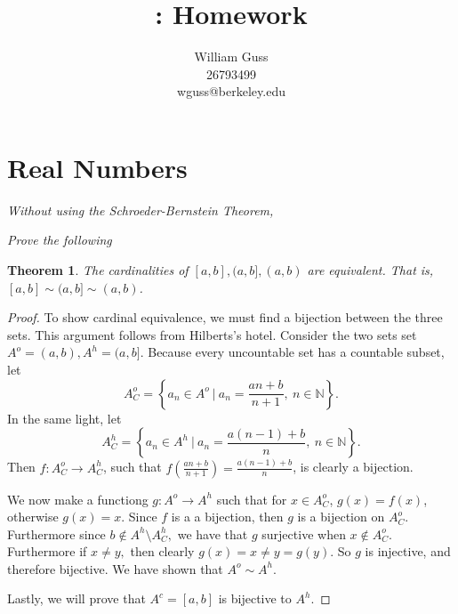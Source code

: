 \documentclass[letter]{article}
\title{\bCLASS: Homework \bHWN}
\author{William Guss\\26793499\\wguss@berkeley.edu}
\newtheorem{theorem}{Theorem}
\newenvironment{menumerate}{%
  \edef\backupindent{\the\parindent}%
  \enumerate%
  \setlength{\parindent}{\backupindent}%
}{\endenumerate}
\begin{document}
\maketitle
\thispagestyle{empty}


\section{Real Numbers}
\begin{menumerate}
	\setcounter{enumi}{35}
	\item \textit{Without using the Schroeder-Bernstein Theorem,}
		\begin{menumerate}
		 	\item \textit{Prove the following}
		 		\begin{theorem}
		 			The cardinalities of $[a,b], (a,b], (a,b)$ are equivalent.
		 			 That is, $[a,b]\sim (a,b]\sim (a,b)$.
	 			 \end{theorem}
	 			 \begin{proof}
	 			 	To show cardinal equivalence, we must find a bijection between the three sets. This argument follows from Hilberts's hotel. Consider the two sets set $A^o = (a,b), A^h = (a,b].$ Because every uncountable set has a countable subset, let $$A^o_C = \left\{a_n \in A^o\  | \ a_n = \frac{an +b}{n+1} ,\  n \in \mathbb{N} \right\}.$$
	 			 	In the same light, let $$A^h_C = \left\{a_n \in A^h\  |\ a_n = \frac{a(n-1) +b}{n} ,\   n \in \mathbb{N} \right\}.$$
	 			 	Then $f: A^o_C \to A^h_C $, such that $f(\frac{an +b}{n+1}) = \frac{a(n-1) +b}{n}$, is clearly a bijection.

	 			 	We now make a functiong $g: A^o \to   A^h$ such that for $x \in A^o_C$, $g(x) = f(x)$, otherwise $g(x) = x.$ Since $f$ is a a bijection, then $g$ is a bijection on $A^o_C$. Furthermore since $b \notin A^h \setminus A^h_C,$ we have that $g$ surjective when $x \notin A^o_C.$ Furthermore if $x \neq y,$ then clearly $g(x) = x \neq y = g(y).$ So $g$ is injective, and therefore bijective. We have shown that $A^o \sim A^h.$

	 			 	Lastly, we will prove that $A^c = [a,b]$ is bijective to $A^h.$ 
	 			 \end{proof}
		 \end{menumerate} 
\end{menumerate}
\end{document}
